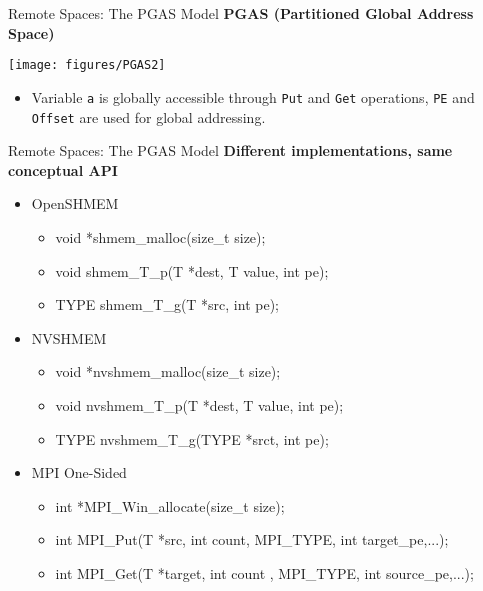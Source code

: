 
\begin{frame}[fragile]{Remote Spaces: The PGAS Model}
  \vspace{15pt}
  \textbf{PGAS (Partitioned Global Address Space)}
  \begin{center}
    \texttt{[image: figures/PGAS2]}
  \end{center}
  \begin{itemize}
    \item Variable \texttt{a} is globally accessible through \texttt{Put} and \texttt{Get} operations,
    \texttt{PE} and \texttt{Offset} are used for global addressing.
  \end{itemize}
\end{frame}


\begin{frame}[fragile]{Remote Spaces: The PGAS Model}
  \vspace{10pt}
  \textbf{Different implementations, same conceptual API}
  \begin{itemize}
    \item OpenSHMEM
    \begin{itemize}
    \item void *shmem\_malloc(size\_t size);
    \item void shmem\_T\_p(T *dest, T value, int pe);
    \item TYPE shmem\_T\_g(T *src, int pe);
    \end{itemize}
    \item NVSHMEM
    \begin{itemize}
    \item void *nvshmem\_malloc(size\_t size);
    \item void nvshmem\_T\_p(T *dest, T value, int pe);
    \item TYPE nvshmem\_T\_g(TYPE *srct, int pe);
    \end{itemize}
    \item MPI One-Sided
    \begin{itemize}
    \item int *MPI\_Win\_allocate(size\_t size);
    \item int MPI\_Put(T *src, int count, MPI\_TYPE, int target\_pe,...);
    \item int MPI\_Get(T *target, int count , MPI\_TYPE, int source\_pe,...);
    \end{itemize}
  \end{itemize}
\end{frame}

